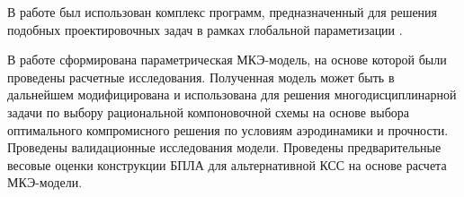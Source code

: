 В работе был использован комплекс программ, предназначенный для решения подобных проектировочных задач в рамках глобальной параметизации \cite{CONVER_Report}.

В работе сформирована параметрическая МКЭ-модель, на основе которой были проведены расчетные исследования. Полученная модель может быть в дальнейшем модифицирована и использована для решения многодисциплинарной задачи по выбору рациональной компоновочной схемы на основе выбора оптимального компромисного решения по условиям аэродинамики и прочности. Проведены валидационные исследования модели. Проведены предварительные весовые оценки конструкции БПЛА для альтернативной КСС на основе расчета МКЭ-модели.   

 